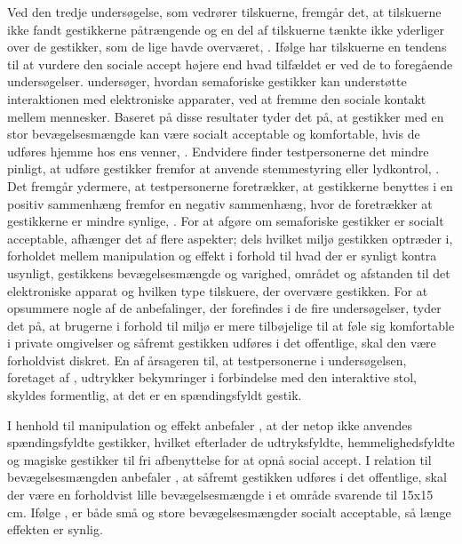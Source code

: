 Ved den tredje undersøgelse, som vedrører tilskuerne, fremgår det, at tilskuerne ikke fandt gestikkerne påtrængende og en del af tilskuerne tænkte ikke yderliger over de gestikker, som de lige havde overværet, \parencite[s. 200]{PDF:AreYouComfortableDoingThat}. Ifølge \textcite[s. 200]{PDF:AreYouComfortableDoingThat} har tilskuerne en tendens til at vurdere den sociale accept højere end hvad tilfældet er ved de to foregående undersøgelser. \blankline
%
\textcite{PDF:AnExploratoryStudy} undersøger, hvordan semaforiske gestikker kan understøtte interaktionen med elektroniske apparater, ved at fremme den sociale kontakt mellem mennesker. Baseret på disse resultater tyder det på, at gestikker med en stor bevægelsesmængde kan være socialt acceptable og komfortable, hvis de udføres hjemme hos ens venner, \parencite[s. 4]{PDF:AnExploratoryStudy}. Endvidere finder testpersonerne det mindre pinligt, at udføre gestikker fremfor at anvende stemmestyring eller lydkontrol, \parencite[s. 4]{PDF:AnExploratoryStudy}. Det fremgår ydermere, at testpersonerne foretrækker, at gestikkerne benyttes i en positiv sammenhæng fremfor en negativ sammenhæng, hvor de foretrækker at gestikkerne er mindre synlige, \parencite[s. 4]{PDF:AnExploratoryStudy}. \blankline
%
For at afgøre om semaforiske gestikker er socialt acceptable, afhænger det af flere aspekter; dels hvilket miljø gestikken optræder i, forholdet mellem manipulation og effekt i forhold til hvad der er synligt kontra usynligt, gestikkens bevægelsesmængde og varighed, området og afstanden til det elektroniske apparat og hvilken type tilskuere, der overvære gestikken. For at opsummere nogle af de anbefalinger, der forefindes i de fire undersøgelser, tyder det på, at brugerne i forhold til miljø er mere tilbøjelige til at føle sig komfortable i private omgivelser og såfremt gestikken udføres i det offentlige, skal den være forholdvist diskret. En af årsageren til, at testpersonerne i undersøgelsen, foretaget af \textcite[s. 4]{PDF:AChairAsUbiquitousInputDevice}, udtrykker bekymringer i forbindelse med den interaktive stol, skyldes formentlig, at det er en spændingsfyldt gestik.

I henhold til manipulation og effekt anbefaler \textcite[s. 278]{PDF:WouldYouDoThat}, at der netop ikke anvendes spændingsfyldte gestikker, hvilket efterlader de udtryksfyldte, hemmelighedsfyldte og magiske gestikker til fri afbenyttelse for at opnå social accept. I relation til bevægelsesmængden anbefaler \textcite[s. 201]{PDF:AreYouComfortableDoingThat}, at såfremt gestikken udføres i det offentlige, skal der være en forholdvist lille bevægelsesmængde i et område svarende til 15x15 cm. Ifølge \textcite[s. 278]{PDF:WouldYouDoThat}, er både små og store bevægelsesmængder socialt acceptable, så længe effekten er synlig.

